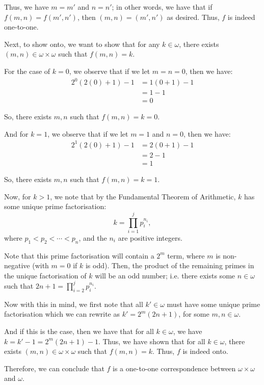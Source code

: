 \documentclass{article}
\begin{document}
\begin{solution}
	Thus, we have $m = m'$ and $n = n'$; in other words, we have that if $f(m,n) = f(m', n')$, then $(m,n) = (m', n')$ as desired. Thus, $f$ is indeed one-to-one.
	
	Next, to show onto, we want to show that for any $k \in \omega$, there exists $(m, n) \in \omega \times \omega$ such that $f(m,n) = k$.
	
	For the case of $k = 0$, we observe that if we let $m = n = 0$, then we have:
	\begin{align*}
		2^{0}(2(0) + 1) - 1 &= 1(0 + 1) - 1 \\
		&= 1 - 1 \\
		&= 0
	\end{align*}

	So, there exists $m,n$ such that $f(m,n) = k = 0$.
	
	And for $k = 1$, we observe that if we let $m = 1$ and $n = 0$, then we have:
	\begin{align*}
		2^{1}(2(0) + 1) - 1 &= 2(0 + 1) - 1 \\
		&= 2 - 1 \\
		&= 1
	\end{align*}

	So, there exists $m, n$ such that $f(m,n) = k = 1$.
	
	Now, for $k > 1$, we note that by the Fundamental Theorem of Arithmetic, $k$ has some unique prime factorisation:
	\begin{equation*}
		k = \prod_{i=1}^{j} p_i^{n_i},
	\end{equation*}
	where $p_1 < p_2 < \cdots < p_n$, and the $n_i$ are positive integers.
	
	Note that this prime factorisation will contain a $2^{m}$ term, where $m$ is non-negative (with $m = 0$ if $k$ is odd). Then, the product of the remaining primes in the unique factorisation of $k$ will be an odd number; i.e. there exists some $n \in \omega$ such that $2n + 1 = \prod_{i=2}^{j} p_i^{n_i}$.
	
	Now with this in mind, we first note that all $k' \in \omega$ must have some unique prime factorisation which we can rewrite as $k' = 2^{m}(2n + 1)$, for some $m, n \in \omega$.
	
	And if this is the case, then we have that for all $k \in \omega$, we have $k = k' - 1 = 2^{m}(2n + 1) - 1$. Thus, we have shown that for all $k \in \omega$, there exists $(m,n) \in \omega \times \omega$ such that $f(m,n) = k$. Thus, $f$ is indeed onto.
	
	Therefore, we can conclude that $f$ is a one-to-one correspondence between $\omega \times \omega$ and $\omega$.
\end{solution}
\end{document}
